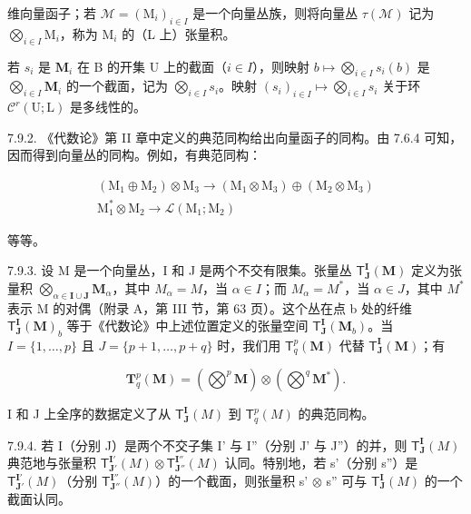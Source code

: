 维向量函子；若 \(\mathcal{M} = (\mathrm{M}_{i})_{i\in I}\) 是一个向量丛族，则将向量丛 \(\tau(\mathcal{M})\) 记为 \(\bigotimes_{i\in I}\mathrm{M}_{i}\)，称为 \(\mathrm{M}_{i}\) 的（L 上）张量积。

若 \(s_i\) 是 \(\mathbf{M}_i\) 在 B 的开集 U 上的截面（\(i \in I\)），则映射 \(b \mapsto \bigotimes_{i \in I} s_i(b)\) 是 \(\bigotimes_{i \in I} \mathbf{M}_i\) 的一个截面，记为 \(\bigotimes_{i \in I} s_i\)。映射 \((s_i)_{i \in I} \mapsto \bigotimes_{i \in I} s_i\) 关于环 \(\mathcal{C}^r(\mathrm{U}; \mathrm{L})\) 是多线性的。

7.9.2. 《代数论》第 II 章中定义的典范同构给出向量函子的同构。由 7.6.4 可知，因而得到向量丛的同构。例如，有典范同构：

\[
\begin{array}{c} (\mathrm{M} _ {1} \oplus \mathrm{M} _ {2}) \otimes \mathrm{M} _ {3} \longrightarrow (\mathrm{M} _ {1} \otimes \mathrm{M} _ {3}) \oplus (\mathrm{M} _ {2} \otimes \mathrm{M} _ {3}) \\ \mathrm{M} _ {1} ^ {*} \otimes \mathrm{M} _ {2} \longrightarrow \mathcal {L} (\mathrm{M} _ {1}; \mathrm{M} _ {2}) \end{array}
\]

等等。

7.9.3. 设 M 是一个向量丛，I 和 J 是两个不交有限集。张量丛 \(\mathsf{T}_{\mathbf{J}}^{\mathbf{I}}(\mathbf{M})\) 定义为张量积 \(\bigotimes_{\alpha\in\mathbf{I}\cup\mathbf{J}}\mathbf{M}_{\alpha}\)，其中 \(M_{\alpha}=M\)，当 \(\alpha\in I\)；而 \(M_{\alpha}=M^{*}\)，当 \(\alpha\in J\)，其中 \(M^{*}\) 表示 M 的对偶（附录 A，第 III 节，第 63 页）。这个丛在点 b 处的纤维 \(\mathsf{T}_{\mathbf{J}}^{\mathbf{I}}(\mathbf{M})_{b}\) 等于《代数论》中上述位置定义的张量空间 \(\mathsf{T}_{\mathbf{J}}^{\mathbf{I}}(\mathbf{M}_{b})\)。当 \(I=\{1,\ldots,p\}\) 且 \(J=\{p+1,\ldots,p+q\}\) 时，我们用 \(\mathsf{T}_{q}^{p}(\mathbf{M})\) 代替 \(\mathsf{T}_{\mathbf{J}}^{\mathbf{I}}(\mathbf{M})\)；有

\[
\mathbf {T} _ {q} ^ {p} (\mathbf {M}) = (\bigotimes^ {p} \mathbf {M}) \otimes (\bigotimes^ {q} \mathbf {M} ^ {*}).
\]

I 和 J 上全序的数据定义了从 \(\mathsf{T}_{\mathbf{J}}^{\mathbf{I}}(M)\) 到 \(\mathsf{T}_{q}^{p}(M)\) 的典范同构。

7.9.4. 若 I（分别 J）是两个不交子集 I' 与 I''（分别 J' 与 J''）的并，则 \(\mathsf{T}_{\mathbf{J}}^{\mathbf{I}}(M)\) 典范地与张量积 \(\mathsf{T}_{\mathbf{J}'}^{\mathbf{I}'}(M) \otimes \mathsf{T}_{\mathbf{J}''}^{\mathbf{I}''}(M)\) 认同。特别地，若 s'（分别 s''）是 \(\mathsf{T}_{\mathbf{J}'}^{\mathbf{I}'}(M)\)（分别 \(\mathsf{T}_{\mathbf{J}''}^{\mathbf{I}''}(M)\)）的一个截面，则张量积 s' \(\otimes\) s'' 可与 \(\mathsf{T}_{\mathbf{J}}^{\mathbf{I}}(M)\) 的一个截面认同。

